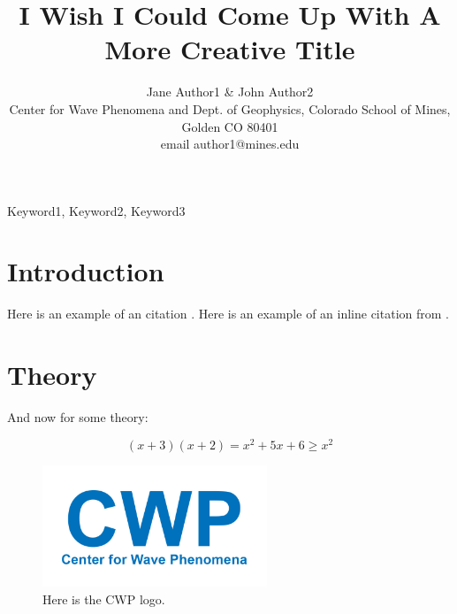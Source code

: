 \documentclass[onecolumn]{cwpreport} %
\title[Short Title]{I Wish I Could Come Up With A More Creative Title}
\author[Author1  \& Author2]{Jane Author1 \& John Author2 
\\
Center for Wave Phenomena and Dept. of Geophysics, Colorado School of Mines, Golden CO 80401 \\ email author1@mines.edu}
\begin{document}
\maketitle


\begin{abstract}
\lipsum[2]
\end{abstract}

\begin{keywords}
Keyword1, Keyword2, Keyword3 
\end{keywords}

\section{Introduction}
\lipsum[2-4]

Here is an example of an citation \citep{hale_atomic_2001}. Here is an example of an inline citation from \cite{haber_inversion_2007}.


\section{Theory}
\lipsum[2-4]

And now for some theory:

\begin{equation}
	(x+3)(x+2)=x^2+5x+6 \geq x^2
\end{equation}


\begin{figure}
    \centering
    \includegraphics[width=0.6\textwidth]{Fig/CWP-logo-alpha.jpg} 
    \caption{Here is the CWP logo.}
    \label{fig:model_map}
\end{figure}
\end{document}
